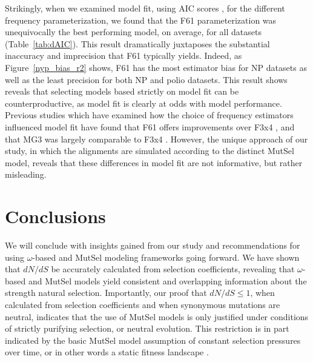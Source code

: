 \documentclass{pnastwo}
\begin{document}
\begin{article}
Strikingly, when we examined model fit, using AIC scores \cite{Akaike1974}, for the different frequency parameterization, we found that the F61 parameterization was unequivocally the best performing model, on average, for all datasets (Table~\ref{tab:dAIC}). This result dramatically juxtaposes the substantial inaccuracy and imprecision that F61 typically yields. Indeed, as Figure~\ref{nyp_bias_r2} shows, F61 has the most estimator bias for NP datasets as well as the least precision for both NP and polio datasets. This result shows reveals that selecting models based strictly on model fit can be counterproductive, as model fit is clearly at odds with model performance. Previous studies which have examined how the choice of frequency estimators influenced model fit have found that F61 offers improvements over F3x4 \cite{GoldmanYang1994}, and that MG3 was largely comparable to F3x4 \cite{KosakovskyPondMuse2005}. However, the unique approach of our study, in which the alignments are simulated according to the distinct MutSel model, reveals that these differences in model fit are not informative, but rather misleading.





\section*{Conclusions}
		
We will conclude with insights gained from our study and recommendations for using $\omega$-based and MutSel modeling frameworks going forward. We have shown that $dN/dS$ be accurately calculated from selection coefficients, revealing that $\omega$-based and MutSel models yield consistent and overlapping information about the strength natural selection. Importantly, our proof that $dN/dS \leq 1$, when calculated from selection coefficients and when synonymous mutations are neutral, indicates that the use of MutSel models is only justified under conditions of strictly purifying selection, or neutral evolution. This restriction is in part indicated by the basic MutSel model assumption of constant selection pressures over time, or in other words a static fitness landscape \cite{HalpernBruno1998,Thorneetal2007,Rodrigue2010,Thorne2012}. 


\end{article}
\end{document}
